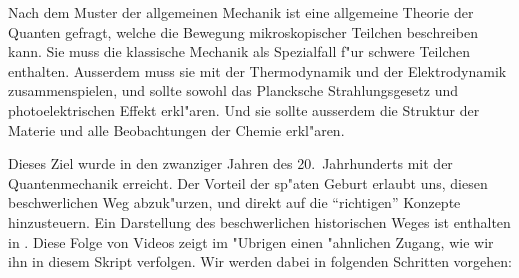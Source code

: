 Nach dem Muster der allgemeinen Mechanik ist eine allgemeine
Theorie der Quanten gefragt, welche die Bewegung mikroskopischer Teilchen
beschreiben kann. Sie muss die klassische Mechanik als Spezialfall
f"ur schwere Teilchen enthalten. Ausserdem muss sie mit der
Thermodynamik und der Elektrodynamik zusammenspielen, und sollte
sowohl das Plancksche Strahlungsgesetz und photoelektrischen
Effekt erkl"aren.
Und sie sollte ausserdem die Struktur der Materie und alle Beobachtungen
der Chemie erkl"aren.

Dieses Ziel wurde in den zwanziger Jahren des 20.~Jahrhunderts mit 
der Quantenmechanik erreicht.
Der Vorteil der sp"aten Geburt erlaubt uns, diesen beschwerlichen Weg
abzuk"urzen, und direkt auf die ``richtigen'' Konzepte hinzusteuern.
Ein Darstellung des beschwerlichen historischen Weges ist enthalten
in \cite{skript:viascience}.
Diese Folge von Videos zeigt im "Ubrigen einen "ahnlichen Zugang,
wie wir ihn in diesem Skript verfolgen.
Wir werden dabei in folgenden Schritten vorgehen:

